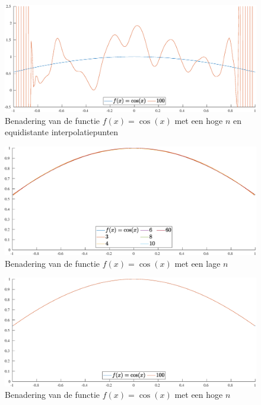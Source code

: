 \documentclass[a4paper, 12pt, titlepage, fleqn]{article}
\begin{document}
\begin{figure}
\centering
\includegraphics[scale=0.4]{../Afbeeldingen/cos_equi_hoog.eps}
\caption{Benadering van de functie $f(x) = \cos(x)$ met een hoge $n$ en equidistante interpolatiepunten}
\label{fig:hogeNCosEqui}
\end{figure}

\begin{figure}
\centering
\includegraphics[scale=0.4]{../Afbeeldingen/cos_nul_laag.eps}
\caption{Benadering van de functie $f(x) = \cos(x)$ met een lage $n$}
\label{fig:lageNCosNul}
\end{figure}

\begin{figure}
\centering
\includegraphics[scale=0.4]{../Afbeeldingen/cos_nul_hoog.eps}
\caption{Benadering van de functie $f(x) = \cos(x)$ met een hoge $n$}
\label{fig:hogeNCosNul}
\end{figure}
\end{document}
